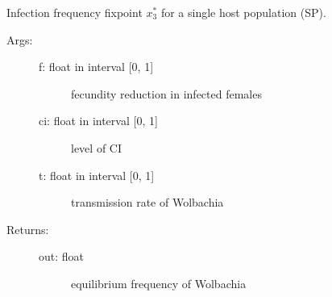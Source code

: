 \documentclass[letterpaper,10pt,english]{sphinxmanual}
\begin{document}
\begin{fulllineitems}
\label{index:wspec.analytical.fix3_SP}
Infection frequency fixpoint $x_3^{\ast}$ for a single host population (SP).
\begin{description}
\item[{Args:}] \leavevmode\begin{description}
\item[{f: float in interval {[}0, 1{]}}] \leavevmode
fecundity reduction in infected females

\item[{ci: float in interval {[}0, 1{]}}] \leavevmode
level of CI

\item[{t: float in interval {[}0, 1{]}}] \leavevmode
transmission rate of Wolbachia

\end{description}

\item[{Returns:}] \leavevmode\begin{description}
\item[{out: float}] \leavevmode
equilibrium frequency of Wolbachia

\end{description}

\end{description}

\end{fulllineitems}

\end{document}
